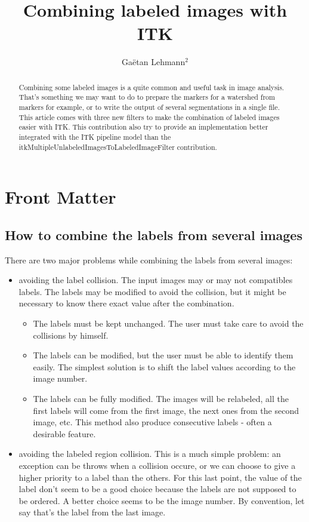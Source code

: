 \documentclass{InsightArticle}
\title{Combining labeled images with ITK}
\author{Ga\"etan Lehmann{$^2$}}
\begin{document}
\maketitle

\ifhtml
\chapter*{Front Matter\label{front}}
\fi


\begin{abstract}
\noindent
Combining some labeled images is a quite common and useful task in image analysis.
That's something we may want to do to prepare the markers for a watershed from
markers for example, or to write the output of several segmentations in a single
file.
This article comes with three new filters to make the combination
of labeled images easier with ITK.
This contribution also try to provide an implementation better integrated with the
ITK pipeline model than the itkMultipleUnlabeledImagesToLabeledImageFilter contribution.
\end{abstract}

\section{How to combine the labels from several images}

There are two major problems while combining the labels from several images:
\begin{itemize}
  \item avoiding the label collision. The input images may or may not compatibles labels.
  The labels may be modified to avoid the collision, but it might be necessary to know
  there exact value after the combination.
  \begin{itemize}
    \item The labels must be kept unchanged. The user must take care to avoid the collisions
    by himself.
    \item The labels can be modified, but the user must be able to identify them easily. The
    simplest solution is to shift the label values according to the image number.
    \item The labels can be fully modified. The images will be relabeled, all the first labels
    will come from the first image, the next ones from the second image, etc. This method also
    produce consecutive labels - often a desirable feature.
  \end{itemize}

  \item avoiding the labeled region collision. This is a much simple problem: an exception
  can be throws when a collision occure, or we can choose to give a higher priority to a
  label than the others. For this last point, the value of the label don't seem to be a good choice
  because the labels are not supposed to be ordered. A better choice seems to be the image
  number. By convention, let say that's the label from the last image.
  
\end{itemize}
\end{document}
